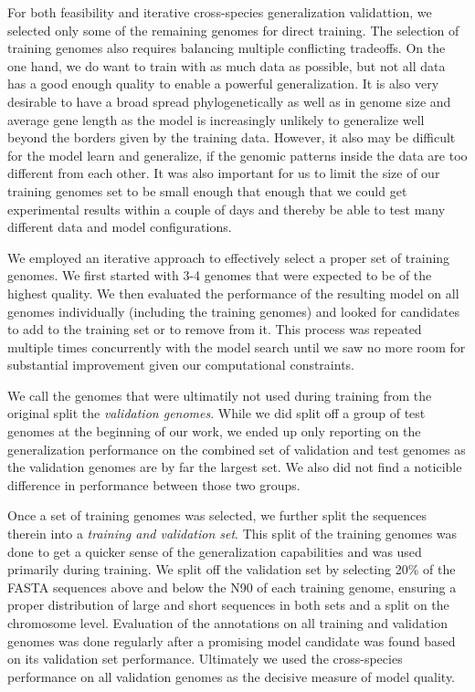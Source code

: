 \documentclass{bioinfo}
\begin{document}
\begin{methods}
For both feasibility and iterative cross-species generalization validattion, we
selected only some of the remaining genomes for direct training.
The selection of training genomes also requires balancing multiple conflicting 
tradeoffs. On the one hand, we do want to train with as much data as possible, but 
not all data has a good enough quality to enable a powerful generalization. It is 
also very desirable to have a broad spread phylogenetically as well as in genome 
size and average gene length as the model is increasingly unlikely to generalize 
well beyond the borders given by the training data. However, it also may be difficult 
for the model learn and generalize, if the genomic patterns inside the data are 
too different from each other. It was also important for us to limit the size of
our training genomes set to be small enough that enough that we could get experimental 
results within a couple of days and thereby be able to test many different data and 
model configurations.

We employed an iterative approach to effectively select a proper set of training 
genomes. We first started with 3-4 genomes that were expected to be of the 
highest quality. We then evaluated the performance of the resulting model on all 
genomes individually (including the training genomes) and looked for candidates to 
add to the training set or to remove from it. This process was repeated multiple 
times concurrently with the model search until we saw no more room for substantial 
improvement given our computational constraints.

We call the genomes that were ultimatily not used during training from the original 
split the {\it validation genomes}. While we did split off a group of test genomes 
at the beginning of our work, we ended up only reporting on the generalization 
performance on the combined set of validation and test genomes as the validation 
genomes are by far the largest set. We also did not find a noticible difference in 
performance between those two groups. 

Once a set of training genomes was selected, we further split the sequences therein into a {\it 
training and validation set}. This split of the training genomes was done to get a 
quicker sense of the generalization capabilities and was used primarily during 
training. We split off the validation set by selecting 20\% of the FASTA sequences 
above and below the N90 of each training genome, ensuring a proper distribution of 
large and short sequences in both sets and a split on the chromosome level. 
Evaluation of the annotations on all training and validation genomes was done 
regularly after a promising model candidate was found based on its validation set 
performance. Ultimately we used the cross-species performance on all 
validation genomes as the decisive measure of model quality.


\end{methods}
\end{document}
